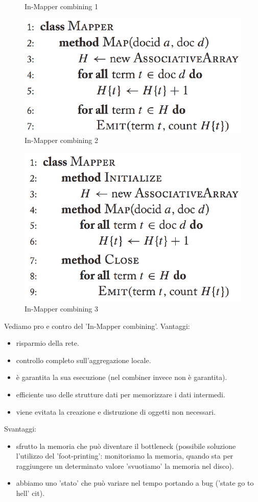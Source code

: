 \documentclass{article}
\begin{document}
\begin{appendices}
\begin{figure}[H]
    \caption{In-Mapper combining 1}
\end{figure}
\begin{figure}[H]
    \centering
    \includegraphics[scale=0.5]{img/In_mapper2.PNG}
    \caption{In-Mapper combining 2}
\end{figure}
\begin{figure}[H]
    \centering
    \includegraphics[scale=0.5]{img/In_mapper3.PNG}
    \caption{In-Mapper combining 3}
\end{figure}
Vediamo pro e contro del 'In-Mapper combining'.
Vantaggi:
\begin{itemize}
    \item risparmio della rete.
    \item controllo completo sull'aggregazione locale.  
    \item è garantita la sua esecuzione (nel combiner invece non è garantita).
    \item efficiente uso delle strutture dati per memorizzare i dati intermedi.
    \item viene evitata la creazione e distruzione di oggetti non necessari.
\end{itemize}
Svantaggi:
\begin{itemize}
    \item sfrutto la memoria che può diventare il bottleneck (possibile soluzione l'utilizzo del 'foot-printing': monitoriamo la memoria, quando sta per raggiungere un determinato valore 'svuotiamo' la memoria nel disco).
    \item abbiamo uno 'stato' che può variare nel tempo portando a bug ('state go to hell' cit).
\end{itemize}


\end{appendices}
\end{document}
